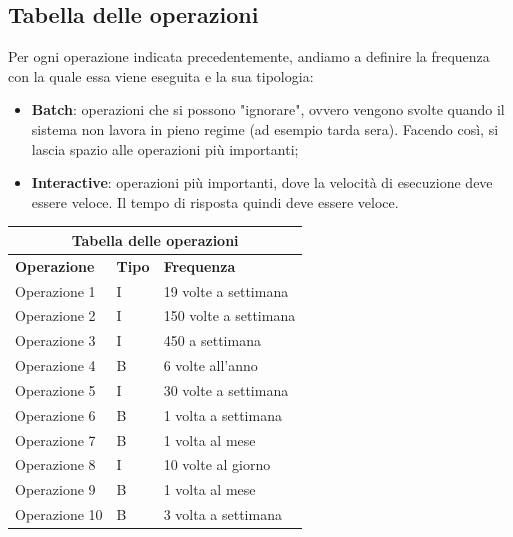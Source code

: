 \documentclass[legalpaper]{article}
\begin{document}
	\subsection{Tabella delle operazioni}
	Per ogni operazione indicata precedentemente, andiamo a definire la frequenza con la quale essa viene eseguita e la sua tipologia:
	\begin{itemize}
		\item \textbf{Batch}: operazioni che si possono "ignorare", ovvero vengono svolte quando il sistema non lavora in pieno regime (ad esempio tarda sera). Facendo così, si lascia spazio alle operazioni più importanti;
		\item \textbf{Interactive}: operazioni più importanti, dove la velocità di esecuzione deve essere veloce. Il tempo di risposta quindi deve essere veloce.
	\end{itemize}
		\renewcommand\arraystretch{2}
		\begin{tabular}{ |p{5cm}|p{2cm}|p{5cm}| }
			\hline
			\multicolumn{3}{|c|}{\textbf{Tabella delle operazioni}} \\
			\hline
			\textbf{Operazione} & \textbf{Tipo} & \textbf{Frequenza} \\
			\hline
			Operazione 1 & I &  19 volte a settimana \\ \hline
			Operazione 2 & I & 150 volte a settimana \\ \hline
			Operazione 3 & I & 450 a settimana \\ \hline
			Operazione 4 & B & 6 volte all'anno \\ \hline
			Operazione 5 & I & 30 volte a settimana \\ \hline
			Operazione 6 & B & 1 volta a settimana \\ \hline
			Operazione 7 & B & 1 volta al mese \\ \hline
			Operazione 8 & I & 10 volte al giorno \\ \hline
			Operazione 9 & B & 1 volta al mese \\ \hline
			Operazione 10 & B & 3 volta a settimana \\ \hline
		
		\end{tabular}	
	
\end{document}
